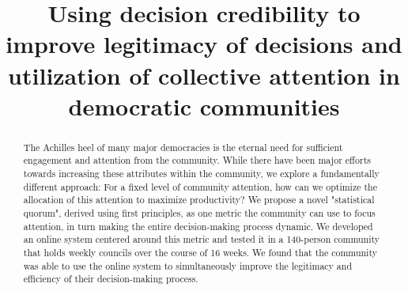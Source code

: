 \documentclass[chi_draft]{sigchi}
\def\plaintitle{Using decision credibility to improve legitimacy of decisions and utilization of collective attention in democratic communities}
\begin{document}
\title{\plaintitle}


\maketitle


\begin{abstract}
The Achilles heel of many major democracies is the eternal need for sufficient engagement and attention from the community.
While there have been major efforts towards increasing these attributes within the community, we explore a fundamentally
different approach: For a fixed level of community attention, how can we optimize the allocation of this attention to
maximize productivity?
We propose a novel "statistical quorum", derived using first principles, as one metric the community can use to focus
attention, in turn making the entire decision-making process dynamic.
We developed an online system centered around this metric and tested it in a 140-person community that holds weekly
councils over the course of 16 weeks.  We found that the community was able to use the online system to simultaneously
improve the legitimacy and efficiency of their decision-making process.
\end{abstract}

%
\end{document}
